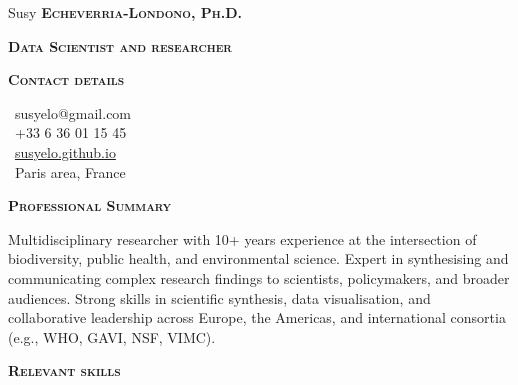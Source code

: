 \documentclass[10pt, a4paper]{article}
\newcommand{\headleft}[1]{\vspace*{3ex}\textsc{\textbf{#1}}\par%
    \vspace*{-1.5ex}\hrulefill\par\vspace*{0.7ex}}
\begin{document}
\setlength{\topskip}{0pt}
\setlength{\parindent}{0pt}
\setlength{\parskip}{0pt}
\setlength{\fboxsep}{0pt}
\pagestyle{empty}
\raggedbottom

\begin{minipage}[t]{0.335\textwidth} %
\colorbox{cvblue}{\begin{minipage}[t][5mm][t]{\textwidth}\null\hfill\null\end{minipage}}

\vspace{-.2ex} %
\colorbox{cvblue!90}{\color{white}  %
\textwidth\relax%
\begin{minipage}[t][293mm][t]{0.82\textwidth}
\raggedright
\vspace*{2.5ex}

\Large Susy \textbf{\textsc{Echeverria-Londono, Ph.D.}} \normalsize 

\textbf{\textsc{Data Scientist and researcher}} 


\headleft{Contact details}
\small %
\MVAt\ {\small susyelo@gmail.com} \\[0.4ex]
\Mobilefone\ +33 6 36 01 15 45 \\[0.5ex]
\Mundus\ \href{https://susyelo.github.io/}{susyelo.github.io} \\[0.1ex]
\Letter\ Paris area, France
\normalsize

\vspace*{0.5ex} %

\headleft{Professional Summary}
Multidisciplinary researcher with 10+ years experience at the intersection of biodiversity, public health, and environmental science. Expert in synthesising and communicating complex research findings to scientists, policymakers, and broader audiences. Strong skills in scientific synthesis, data visualisation, and collaborative leadership across Europe, the Americas, and international consortia (e.g., WHO, GAVI, NSF, VIMC).

\headleft{Relevant skills}
\begin{itemize}


\end{itemize}
\end{minipage}}
\end{minipage}
\end{document}
